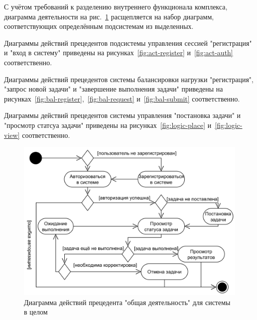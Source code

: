 \documentclass[a4paper,12pt]{report}
\numberwithin{equation}{section}
\begin{document}
С учётом требований к разделению внутреннего функционала комплекса, диаграмма деятельности на рис.~\ref{fig:act-common}
расщепляется на набор диаграмм, соответствующих определённым подсистемам из выделенных.

Диаграммы действий прецедентов подсистемы управления сессией "регистрация" и "вход в систему" приведены на рисунках~\ref{fig:act-register} и~\ref{fig:act-auth} соответственно.

Диаграммы действий прецедентов системы балансировки нагрузки "регистрация", "запрос новой задачи" и "завершение выполнения задачи" приведены на рисунках~\ref{fig:bal-register},~\ref{fig:bal-request} и~\ref{fig:bal-submit} соответственно.

Диаграммы действий прецедентов системы управления "постановка задачи" и "просмотр статсуа задачи" приведены на рисунках~\ref{fig:logic-place} и~\ref{fig:logic-view} соответственно.

\begin{figure}[h]
  \centering
  \includegraphics[width=.9\linewidth]{../diagrams/common/activity}
  \caption{Диаграмма действий прецедента "общая деятельность" для системы в целом}
  \label{fig:act-common}
\end{figure}
\end{document}
